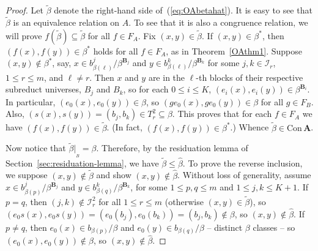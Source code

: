 \documentclass[cm,dissertation,actual,final]{uhthesis}
\theoremstyle{plain}
\theoremstyle{definition}
\theoremstyle{remark}
\numberwithin{theorem}{section}
\numberwithin{claim}{chapter}
\numberwithin{equation}{section}
\numberwithin{conjecture}{chapter}
\newcommand{\<}{\ensuremath{\langle}}
\renewcommand{\>}{\ensuremath{\rangle}}
\renewcommand{\leq}{\ensuremath{\leqslant}}
\newcommand{\Con}{\ensuremath{\mathrm{Con\,}}}
\newcommand{\0}{\ensuremath{\mathbf{0}}}
\newcommand{\1}{\ensuremath{\mathbf{1}}}
\newcommand{\2}{\ensuremath{\mathbf{2}}}
\newcommand{\3}{\ensuremath{\mathbf{3}}}
\newcommand{\4}{\ensuremath{\mathbf{4}}}
\newcommand{\5}{\ensuremath{\mathbf{5}}}
\newcommand{\bA}{\ensuremath{\mathbf{A}}}
\newcommand{\bB}{\ensuremath{\mathbf{B}}}
\newcommand{\sI}{\ensuremath{\mathscr{I}}}
\newcommand{\resB}{\ensuremath{|_{_B}}}
\newcommand{\tbeta}{\ensuremath{\widetilde{\beta}}}
\begin{document}
\begin{proof}
  Let $\tbeta$ denote the right-hand side of~(\ref{eq:OAbetahat}).  It is
  easy to see that $\tbeta$ is an equivalence relation on $A$.  To see that it
  is also a congruence relation, we will prove $f(\tbeta) \subseteq \tbeta$ for
  all $f\in F_A$.
  Fix $(x,y)\in \tbeta$.  If 
  $(x,y)\in \beta^*$, then $(f(x), f(y)) \in \beta^*$ holds for all $f\in F_A$, as
  in Theorem~\ref{OAthm1}. 
  Suppose $(x,y)\notin \beta^*$, say,  
  $x \in b^j_{\beta(\ell)}/\beta^{\bB_j}$ and 
  $y\in b^k_{\beta(\ell)}/\beta^{\bB_k}$ for some $j, k \in \sI_r$, $1\leq r
  \leq m$, and $\ell\neq r$.  
  Then $x$ and $y$ are in the $\ell$-th blocks of their respective subreduct
  universes, $B_j$ and $B_k$, so 
  for each $0\leq i \leq K$, 
  $(e_i(x), e_i(y)) \in \beta^{\bB_i}$.
  In particular, $(e_0(x), e_0(y)) \in \beta$, so 
  $(g e_0(x), g e_0(y)) \in \beta$ for all $g\in F_B$.
  Also, $(s(x), s(y)) = (b_j, b_k) \in T_r^2 \subseteq \beta$. 
  This proves that for each $f\in F_A$ we have $(f(x), f(y)) \in \tbeta$. (In
  fact, $(f(x), f(y))\in \beta^*$.)  Whence $\tbeta \in \Con\bA$.

  Now notice that $\tbeta\resB = \beta$.  Therefore, by the residuation lemma
  of Section~\ref{sec:residuation-lemma}, we have $\tbeta \leq \widehat{\beta}$.
  To prove the reverse inclusion, we suppose $(x,y)\notin \tbeta$ and show $(x,y) \notin \widehat{\beta}$.
  Without loss of generality, assume $x \in b^j_{\beta(p)}/\beta^{\bB_j}$ and 
  $y\in b^k_{\beta(q)}/\beta^{\bB_k}$, for some $1\leq p, q
  \leq m$ and $1\leq j, k \leq K+1$.  If $p=q$, then $(j,k)\notin \sI_r^2$ for all
  $1\leq r\leq m$ (otherwise $(x,y)\in \tbeta$), so
  $(e_0s(x), e_0s(y)) = (e_0(b_j), e_0(b_k)) = (b_j, b_k) \notin \beta$,
  so $(x,y) \notin \widehat{\beta}$.  If $p\neq q$, then 
  $e_0(x) \in b_{\beta(p)}/\beta$ and $e_0(y)\in b_{\beta(q)}/\beta$ -- distinct $\beta$ classes -- so 
  $(e_0(x),e_0(y))\notin \beta$, so 
  $(x,y) \notin \widehat{\beta}$.


\end{proof}
\end{document}
